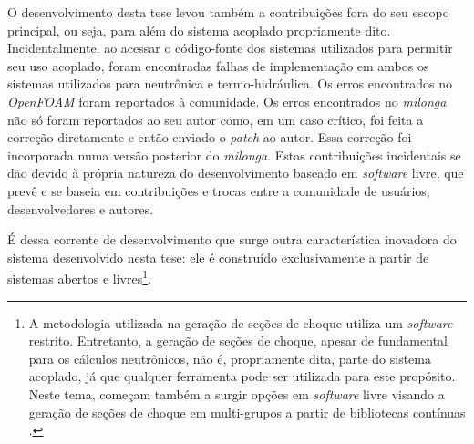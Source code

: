 O desenvolvimento desta tese levou também a contribuições fora do seu escopo principal,
ou seja, para além do sistema acoplado propriamente dito.
Incidentalmente, ao acessar o código-fonte dos sistemas utilizados para permitir seu
uso acoplado, foram encontradas
falhas de implementação em ambos os sistemas utilizados para neutrônica e termo-hidráulica.
Os erros encontrados no \textit{OpenFOAM} foram reportados à comunidade.
Os erros encontrados no \textit{milonga} não só foram reportados ao seu autor como,
em um caso crítico, foi feita a correção diretamente e então enviado o \textit{patch} ao autor.
Essa correção foi incorporada numa versão posterior do \textit{milonga}.
Estas contribuições incidentais se dão devido à própria natureza do desenvolvimento baseado
em \textit{software} livre, que prevê e se baseia em contribuições e trocas entre a comunidade
de usuários, desenvolvedores e autores.

É dessa corrente de desenvolvimento que surge outra característica inovadora
do sistema desenvolvido nesta tese: ele é construído exclusivamente a partir
de sistemas abertos e livres\footnote{A metodologia utilizada
  na geração de seções de choque utiliza um \textit{software} restrito. Entretanto, a geração
  de seções de choque, apesar de fundamental para os cálculos neutrônicos, não é, propriamente dita,
  parte do sistema acoplado, já que qualquer ferramenta pode ser utilizada para este propósito. Neste tema, começam também a surgir opções em \textit{software} livre
  visando a geração de seções de choque em multi-grupos a partir de bibliotecas contínuas \cite{NJOY2016}.}.




